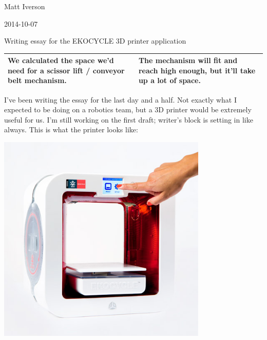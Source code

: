 Matt Iverson

2014-10-07

Writing essay for the EKOCYCLE 3D printer application

\begin{tabular}{|p{5cm}|p{5cm}|}
 \hline
 We calculated the space we’d need for a scissor lift / conveyor belt mechanism. &
 The mechanism will fit and reach high enough, but it’ll take up a lot of space. \\
 \hline
\end{tabular}

I’ve been writing the essay for the last day and a half. Not exactly what I expected to be doing on a robotics team, but a 3D printer would be extremely useful for us. I’m still working on the first draft; writer’s block is setting in like always. This is what the printer looks like:

\includegraphics[width=10cm]{./Entries/Images/ekocycle.jpg}
